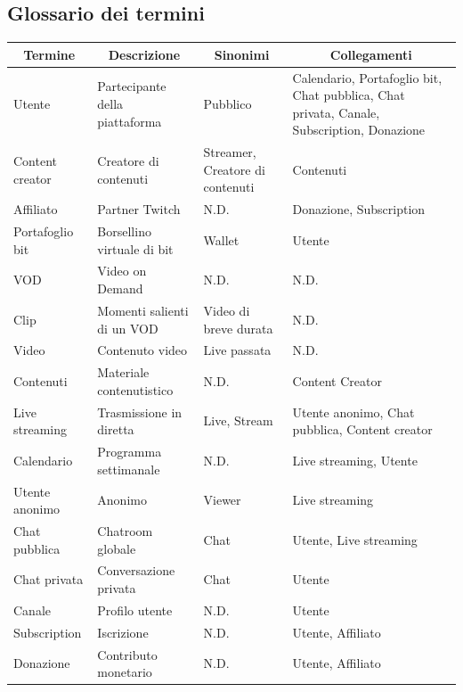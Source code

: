 \begin{landscape}
\setlength{\parskip}{2em}
\subsection{Glossario dei termini}
\begin{center}
\begin{tabular}{ |p{5cm}|p{7cm}|p{4cm}|p{5cm}|  }
 \hline
 \multicolumn{1}{|c|}{\textbf{Termine}} 
 & \multicolumn{1}{|c|}{\textbf{Descrizione}} 
 & \multicolumn{1}{|c|}{\textbf{Sinonimi}}
 & \multicolumn{1}{|c|}{\textbf{Collegamenti}}\\
 \hline
 Utente & Partecipante della piattaforma & Pubblico & Calendario, Portafoglio bit, Chat pubblica, Chat privata, Canale, Subscription, Donazione\\
 \hline
 Content creator & Creatore di contenuti & Streamer, Creatore di contenuti & Contenuti\\
 \hline
 Affiliato & Partner Twitch & N.D. & Donazione, Subscription\\
 \hline
 Portafoglio bit & Borsellino virtuale di bit & Wallet & Utente\\
 \hline
 VOD & Video on Demand & N.D. & N.D.\\
 \hline
 Clip & Momenti salienti di un VOD & Video di breve durata & N.D.\\
 \hline
 Video & Contenuto video & Live passata & N.D.\\
 \hline
 Contenuti & Materiale contenutistico & N.D. & Content Creator\\
 \hline
 Live streaming & Trasmissione in diretta & Live, Stream & Utente anonimo, Chat pubblica, Content creator\\
 \hline
 Calendario & Programma settimanale & N.D. & Live streaming, Utente\\
 \hline
 Utente anonimo & Anonimo & Viewer & Live streaming\\
 \hline 
 Chat pubblica & Chatroom globale & Chat & Utente, Live streaming\\
 \hline
 Chat privata & Conversazione privata & Chat & Utente\\
 \hline
 Canale & Profilo utente & N.D. & Utente\\
 \hline 
 Subscription & Iscrizione & N.D. & Utente,  Affiliato\\
 \hline
 Donazione & Contributo monetario & N.D. & Utente, Affiliato\\
 \hline
\end{tabular}
\end{center}
\end{landscape}
\restoregeometry

